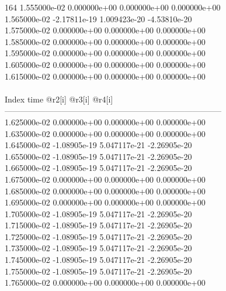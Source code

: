 164	1.555000e-02	0.000000e+00	0.000000e+00	0.000000e+00	\\ 	1.565000e-02	-2.17811e-19	1.009423e-20	-4.53810e-20	\\ 	1.575000e-02	0.000000e+00	0.000000e+00	0.000000e+00	\\ 	1.585000e-02	0.000000e+00	0.000000e+00	0.000000e+00	\\ 	1.595000e-02	0.000000e+00	0.000000e+00	0.000000e+00	\\ 	1.605000e-02	0.000000e+00	0.000000e+00	0.000000e+00	\\ 	1.615000e-02	0.000000e+00	0.000000e+00	0.000000e+00	\\ \hline
\\ \hline
Index   time            @r2[i]          @r3[i]          @r4[i]          \\ \hline
--------------------------------------------------------------------------------\\ 	1.625000e-02	0.000000e+00	0.000000e+00	0.000000e+00	\\ 	1.635000e-02	0.000000e+00	0.000000e+00	0.000000e+00	\\ 	1.645000e-02	-1.08905e-19	5.047117e-21	-2.26905e-20	\\ 	1.655000e-02	-1.08905e-19	5.047117e-21	-2.26905e-20	\\ 	1.665000e-02	-1.08905e-19	5.047117e-21	-2.26905e-20	\\ 	1.675000e-02	0.000000e+00	0.000000e+00	0.000000e+00	\\ 	1.685000e-02	0.000000e+00	0.000000e+00	0.000000e+00	\\ 	1.695000e-02	0.000000e+00	0.000000e+00	0.000000e+00	\\ 	1.705000e-02	-1.08905e-19	5.047117e-21	-2.26905e-20	\\ 	1.715000e-02	-1.08905e-19	5.047117e-21	-2.26905e-20	\\ 	1.725000e-02	-1.08905e-19	5.047117e-21	-2.26905e-20	\\ 	1.735000e-02	-1.08905e-19	5.047117e-21	-2.26905e-20	\\ 	1.745000e-02	-1.08905e-19	5.047117e-21	-2.26905e-20	\\ 	1.755000e-02	-1.08905e-19	5.047117e-21	-2.26905e-20	\\ 	1.765000e-02	0.000000e+00	0.000000e+00	0.000000e+00	\\ \hline
